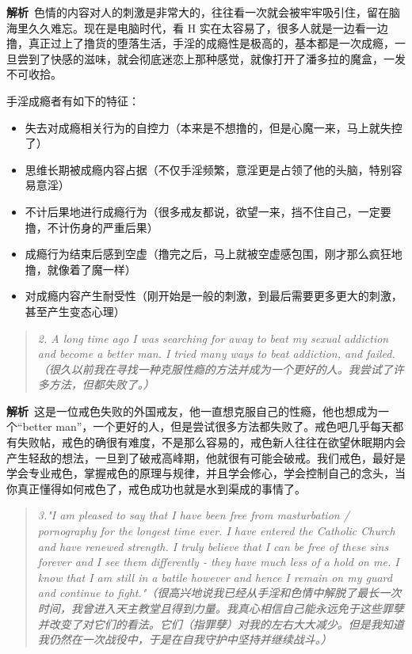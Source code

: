 \textbf{解析}\ 色情的内容对人的刺激是非常大的，往往看一次就会被牢牢吸引住，留在脑海里久久难忘。现在是电脑时代，看 H 实在太容易了，很多人就是一边看一边撸，真正过上了撸货的堕落生活，手淫的成瘾性是极高的，基本都是一次成瘾，一旦尝到了快感的滋味，就会彻底迷恋上那种感觉，就像打开了潘多拉的魔盒，一发不可收拾。

手淫成瘾者有如下的特征：

\begin{itemize}
    \item 失去对成瘾相关行为的自控力（本来是不想撸的，但是心魔一来，马上就失控了）
    \item 思维长期被成瘾内容占据（不仅手淫频繁，意淫更是占领了他的头脑，特别容易意淫）
    \item 不计后果地进行成瘾行为（很多戒友都说，欲望一来，挡不住自己，一定要撸，不计伤身的严重后果）
    \item 成瘾行为结束后感到空虚（撸完之后，马上就被空虚感包围，刚才那么疯狂地撸，就像着了魔一样）
    \item 对成瘾内容产生耐受性（刚开始是一般的刺激，到最后需要更多更大的刺激，甚至产生变态心理）
\end{itemize}

\begin{quote}\it
    2. A long time ago I was searching for away to beat my sexual addiction and become a better man. I tried many ways to beat addiction, and failed.（很久以前我在寻找一种克服性瘾的方法并成为一个更好的人。我尝试了许多方法，但都失败了。）
\end{quote}

\textbf{解析}\ 这是一位戒色失败的外国戒友，他一直想克服自己的性瘾，他也想成为一个“better man”，一个更好的人，但是尝试很多方法都失败了。戒色吧几乎每天都有失败帖，戒色的确很有难度，不是那么容易的，戒色新人往往在欲望休眠期内会产生轻敌的想法，一旦到了破戒高峰期，他就很有可能会破戒。我们戒色，最好是学会专业戒色，掌握戒色的原理与规律，并且学会修心，学会控制自己的念头，当你真正懂得如何戒色了，戒色成功也就是水到渠成的事情了。

\begin{quote}\it
    3."I am pleased to say that I have been free from masturbation / pornography for the longest time ever. I have entered the Catholic Church and have renewed strength. I truly believe that I can be free of these sins forever and I see them differently - they have much less of a hold on me. I know that I am still in a battle however and hence I remain on my guard and continue to fight."（很高兴地说我已经从手淫和色情中解脱了最长一次时间，我曾进入天主教堂且得到力量。我真心相信自己能永远免于这些罪孽并改变了对它们的看法。它们（指罪孽）对我的左右大大减少。但是我知道我仍然在一次战役中，于是在自我守护中坚持并继续战斗。）
\end{quote}

